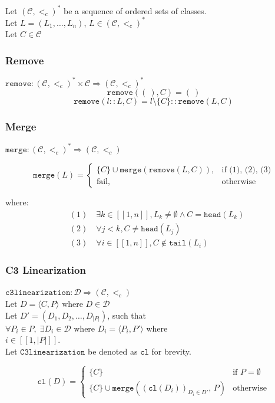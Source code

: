 \documentclass[runningheads]{llncs}
\newcommand*{\CC}{\ensuremath{\mathcal{C}}\xspace}
\newcommand*{\DD}{\ensuremath{\mathcal{D}}\xspace}
\newcommand*{\ordCC}{\ensuremath{(\mathcal{C}, <_c)}\xspace}
\newcommand*{\cl}{\texttt{c3linearization}}
\newcommand*{\rem}{\texttt{remove}}
\newcommand*{\h}{\texttt{head}}
\newcommand*{\mer}{\texttt{merge}}
\newcommand*{\oneToN}{\ensuremath{[\![1,n]\!]}\xspace}
\begin{document}
Let $\ordCC^*$ be a sequence of ordered sets of classes.\\
Let $L = (L_1, \ldots , L_n)$, $L \in \ordCC^*$\\
Let $C \in \mathcal{C}$\\

\subsubsection{Remove}

$\rem : \ordCC^* \times \CC \Rightarrow \ordCC^*$\\
\[
\rem(( \ ), C) = ( \ )
\]
\[
\rem(l::L, C) = l \setminus \{C\} :: \rem(L,C)
\]

\subsubsection{Merge}
$\mer : \ordCC^* \Rightarrow \ordCC $

\begin{equation*}
\mer(L)=
\begin{cases} 
\{C\} \cup \mer(\rem(L, C)), & \text{if (1), (2), (3)} \\
\text{fail}, & \text{otherwise}
\end{cases}
\end{equation*}

where:
\begin{align*}
&(1) \quad \exists k \in \oneToN, L_k \neq \emptyset \land C = \h(L_k) \\
&(2) \quad \forall j < k, C \neq \h(L_j) \\
&(3) \quad \forall i \in \oneToN, C \notin \texttt{tail}(L_i)
\end{align*}

\subsubsection{C3 Linearization}
$\cl: \DD \Rightarrow \ordCC$\\
$\text{Let } D = \langle C, P \rangle \text{ where } D \in \DD$\\
Let $D' = (D_1,D_2, \dots ,D_{|P|})$, such that \\
$\forall P_i \in P, \; \exists D_i \in \DD \text{ where } D_i = \langle P_i, P' \rangle$ where\\ $i \in  [\![1, |P|]\!]$.\\
Let $\texttt{C3linearization}$ be denoted as $\texttt{cl}$ for brevity.

\[
\texttt{cl}(D) =
\begin{cases}
\{C\} & \text{if } P = \emptyset \\
\{C\} \cup \mer\left( \left( \texttt{cl}(D_i) \right)_{D_i \in D'},\, P \right) & \text{otherwise}
\end{cases}
\]

\printbibliography
\end{document}
